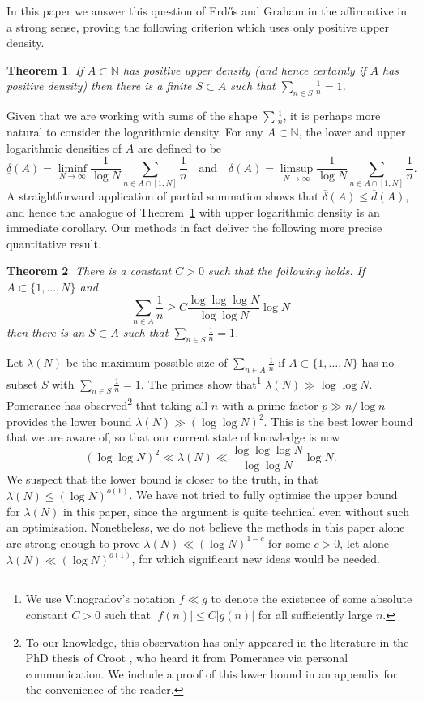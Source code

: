 \documentclass[12pt]{amsart}
\newcommand{\bbn}{\mathbb{N}}
\newcommand{\abs}[1]{\left\lvert #1\right\rvert}
\newtheorem{theorem}{Theorem}
\begin{document}
In this paper we answer this question of Erd\H{o}s and Graham in the affirmative in a strong sense, proving the following criterion which uses only positive upper density.
\begin{theorem}\label{th-dens}
If $A\subset \bbn$ has positive upper density (and hence certainly if $A$ has positive density) then there is a finite $S\subset A$ such that $\sum_{n\in S}\frac{1}{n}=1$.
\end{theorem}

Given that we are working with sums of the shape $\sum\frac{1}{n}$, it is perhaps more natural to consider the logarithmic density. For any $A\subset \bbn$, the lower and upper logarithmic densities of $A$ are defined to be
\[\underline{\delta}(A) = \liminf_{N\to\infty}\frac{1}{\log N}\sum_{n\in A\cap [1,N]}\frac{1}{n}\quad\textrm{and}\quad\overline{\delta}(A) = \limsup_{N\to\infty}\frac{1}{\log N}\sum_{n\in A\cap [1,N]}\frac{1}{n}.\]
A straightforward application of partial summation shows that $\overline{\delta}(A)\leq \overline{d}(A)$, and hence the analogue of Theorem~\ref{th-dens} with upper logarithmic density is an immediate corollary. Our methods in fact deliver the following more precise quantitative result.
\begin{theorem}\label{th-quant}
There is a constant $C>0$ such that the following holds. If $A\subset \{1,\ldots,N\}$ and 
\[\sum_{n\in A}\frac{1}{n}\geq C \frac{\log \log\log N}{\log\log N}\log N\]
then there is an $S\subset A$ such that $\sum_{n\in S}\frac{1}{n}=1$.
\end{theorem}
Let $\lambda(N)$ be the maximum possible size of $\sum_{n\in A}\frac{1}{n}$ if $A\subset \{1,\ldots,N\}$ has no subset $S$ with $\sum_{n\in S}\frac{1}{n}=1$. The primes show that\footnote{We use Vinogradov's notation $f\ll g$ to denote the existence of some absolute constant $C>0$ such that $\abs{f(n)}\leq C\abs{g(n)}$ for all sufficiently large $n$.} $\lambda(N) \gg \log\log N$. Pomerance has observed\footnote{To our knowledge, this observation has only appeared in the literature in the PhD thesis of Croot \cite{Crootphd}, who heard it from Pomerance via personal communication. We include a proof of this lower bound in an appendix  for the convenience of the reader.}  that taking all $n$ with a prime factor $p\gg n/\log n$ provides the lower bound $\lambda(N) \gg (\log\log N)^2$. This is the best lower bound that we are aware of, so that our current state of knowledge is now
\[(\log\log N)^2 \ll \lambda(N) \ll \frac{\log \log\log N}{\log\log N}\log N.\]
 We suspect that the lower bound is closer to the truth, in that $\lambda(N)\leq (\log N)^{o(1)}$. We have not tried to fully optimise the upper bound for $\lambda(N)$ in this paper, since the argument is quite technical even without such an optimisation. Nonetheless, we do not believe the methods in this paper alone are strong enough to prove $\lambda(N) \ll (\log N)^{1-c}$ for some $c>0$, let alone $\lambda(N)\ll (\log N)^{o(1)}$, for which significant new ideas would be needed.
\end{document}

